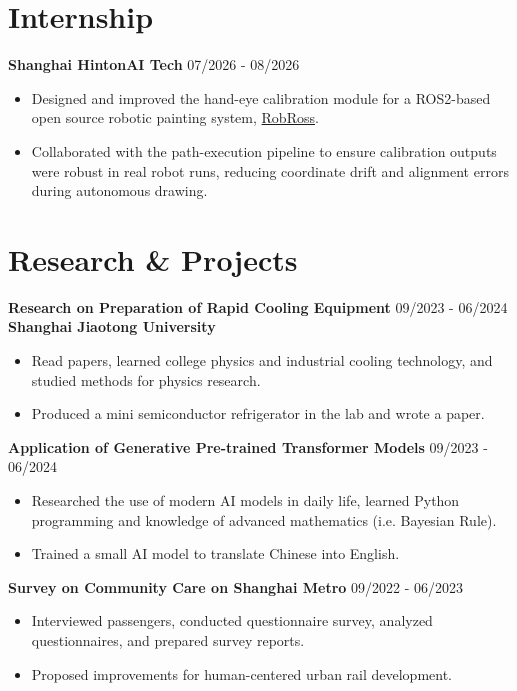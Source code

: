 \documentclass[a4paper,12pt]{article}
\begin{document}
\section{Internship}
\noindent \textbf{Shanghai HintonAI Tech} \hfill 07/2026 - 08/2026
\begin{itemize}
    \item Designed and improved the hand-eye calibration module for a ROS2-based open source robotic painting system, \href{https://github.com/dwarfguard/RobRoss}{RobRoss}.
    \item Collaborated with the path-execution pipeline to ensure calibration outputs were robust in real robot runs, reducing coordinate drift and alignment errors during autonomous drawing.
\end{itemize}


\section{Research \& Projects}
\noindent \textbf{Research on Preparation of Rapid Cooling Equipment} \hfill 09/2023 - 06/2024 \\ \textbf{Shanghai Jiaotong University}
\begin{itemize}
    \item Read papers, learned college physics and industrial cooling technology, and studied methods for physics research.
    \item Produced a mini semiconductor refrigerator in the lab and wrote a paper.
\end{itemize}
\noindent \textbf{Application of Generative Pre-trained Transformer Models} \hfill 09/2023 - 06/2024
\begin{itemize}
    \item Researched the use of modern AI models in daily life, learned Python programming and knowledge of advanced mathematics (i.e. Bayesian Rule).
    \item Trained a small AI model to translate Chinese into English.
\end{itemize}
\noindent \textbf{Survey on Community Care on Shanghai Metro} \hfill 09/2022 - 06/2023
\begin{itemize}
    \item Interviewed passengers, conducted questionnaire survey, analyzed questionnaires, and prepared survey reports.
    \item Proposed improvements for human-centered urban rail development.
\end{itemize}
\end{document}
